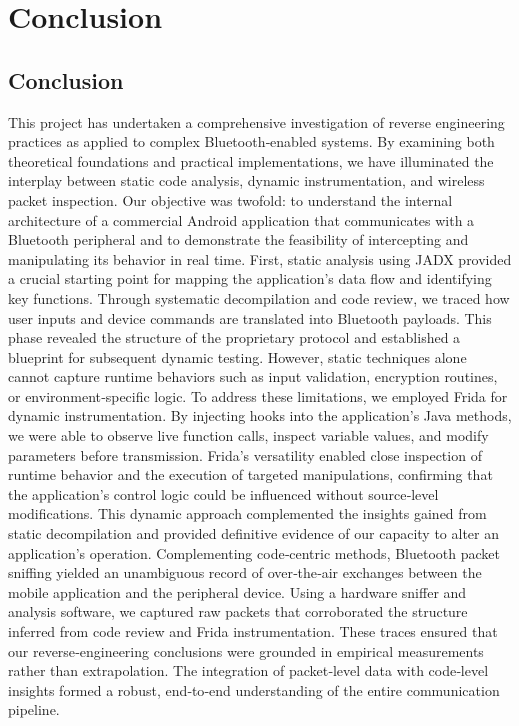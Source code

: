 \chapter{Conclusion}
\section{Conclusion}
This project has undertaken a comprehensive investigation of reverse engineering practices as applied to complex Bluetooth‑enabled systems. By examining both theoretical foundations and practical implementations, we have illuminated the interplay between static code analysis, dynamic instrumentation, and wireless packet inspection. Our objective was twofold: to understand the internal architecture of a commercial Android application that communicates with a Bluetooth peripheral and to demonstrate the feasibility of intercepting and manipulating its behavior in real time.
First, static analysis using JADX provided a crucial starting point for mapping the application’s data flow and identifying key functions. Through systematic decompilation and code review, we traced how user inputs and device commands are translated into Bluetooth payloads. This phase revealed the structure of the proprietary protocol and established a blueprint for subsequent dynamic testing. However, static techniques alone cannot capture runtime behaviors such as input validation, encryption routines, or environment‑specific logic.
To address these limitations, we employed Frida for dynamic instrumentation. By injecting hooks into the application’s Java methods, we were able to observe live function calls, inspect variable values, and modify parameters before transmission. Frida’s versatility enabled close inspection of runtime behavior and the execution of targeted manipulations, confirming that the application’s control logic could be influenced without source‑level modifications. This dynamic approach complemented the insights gained from static decompilation and provided definitive evidence of our capacity to alter an application’s operation.
Complementing code‑centric methods, Bluetooth packet sniffing yielded an unambiguous record of over‑the‑air exchanges between the mobile application and the peripheral device. Using a hardware sniffer and analysis software, we captured raw packets that corroborated the structure inferred from code review and Frida instrumentation. These traces ensured that our reverse‑engineering conclusions were grounded in empirical measurements rather than extrapolation. The integration of packet‑level data with code‑level insights formed a robust, end‑to‑end understanding of the entire communication pipeline.
